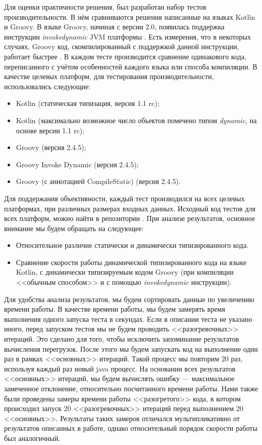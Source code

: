 Для оценки практичности решения, был разработан набор тестов производительности. В нём сравниваются решения написанные на языках Kotlin и Groovy. В языке Groovy, начиная с версии 2.0, появилась поддержка инструкции \textit{invokedynamic} JVM платформы \cite{groovy:invokeDynamicSupport}. Есть измерения, что в некоторых случаях, Groovy код, скомпилированный с поддержкой данной инструкции, работает быстрее \cite{groovy:indyTest1}.
В каждом тесте производится сравнение одинакового кода, переписанного с учётом особенностей каждого языка или способа компиляции. В качестве целевых платформ, для тестирования производительности, использовались следующие:

\begin{itemize}
    \item Kotlin (статическая типизация, версия 1.1 rc);
    \item Kotlin (максимально возможное число объектов помечено типом \textit{dynamic}, на основе версии 1.1 rc);
    \item Groovy (версия 2.4.5);
    \item Groovy Invoke Dynamic (версия 2.4.5);
    \item Groovy (с аннотацией CompileStatic) (версия 2.4.5).
\end{itemize}


Для поддержания объективности, каждый тест производился на всех целевых платформах, при различных размерах входных данных. Исходный код тестов для всех платформ, можно найти в репозитории \cite{github:myBenchs}. При анализе результатов, основное внимание мы будем обращать на следующее:

\begin{itemize}
    \item Относительное различие статически и динамически типизированного кода.
    \item Сравнение скорости работы динамической типизированного кода на языке Kotlin, с динамически типизируемым кодом Groovy (при компиляции <<обычным способом>> и с помощью \textit{invokedynamic} инструкции).
\end{itemize}

Для удобства анализа результатов, мы будем сортировать данные по увеличению времени работы. В качестве времени работы, мы будем замерять время выполнения одного запуска теста в секундах. Если в описании теста не указано иного, перед запуском тестов мы не будем проводить <<разогревочных>> итераций. Это сделано для того, чтобы исключить запоминание результатов вычисления перегрузок. После этого мы будем запускать код на выполнение один раз в рамках <<основных>> итераций. Такой процесс мы повторим 20 раз, используя каждый раз новый java процесс. На основании всех результатов <<основных>> итераций, мы будем вычислять ошибку --- максимальное замеченное отклонение, относительно посчитанного времени работы. Нами также были проведены замеры времени работы <<разогретого>> кода, в котором происходил запуск 20 <<разогревочных>> итераций перед выполнением 20 <<основных>>. Результаты таких замеров отличался мультипликативно от результатов описанных в работе, однако относительный порядок скорости работы был аналогичный.

